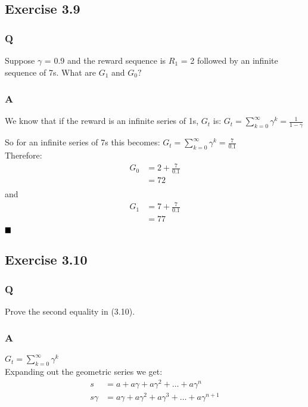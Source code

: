 \subsection{Exercise 3.9}
\subsubsection*{Q}
Suppose \(\gamma\)  = 0.9 and the reward sequence is $R_1$ = 2 followed by an infinite sequence of 7s. What are $G_1$ and $G_0?$

\subsubsection*{A}
We know that if the reward is an infinite series of 1s, $G_t$ is:
$
G_t = \sum_{k=0}^{\infty} \gamma^k = \frac{1}{1-\gamma}
$

So for an infinite series of 7s this becomes:
$
G_t = \sum_{k=0}^{\infty} \gamma^k = \frac{7}{0.1}
$
\\
Therefore:
\begin{align}
G_0 &= 2 + \frac{7}{0.1} \\
&= 72\\
\end{align}
and 
\begin{align}
G_1 &= 7 + \frac{7}{0.1} \\
&= 77\\
\end{align}
$
\hfill \blacksquare
$

\subsection{Exercise 3.10}
\subsubsection*{Q}
Prove the second equality in (3.10). 

\subsubsection*{A}
$
G_t = \sum_{k=0}^{\infty} \gamma^k
$
\\
Expanding out the geometric series we get:
\begin{align}
s &= a + a\gamma + a\gamma^2 + \ldots + a\gamma^n\\
s\gamma &= a\gamma + a\gamma^2 + a\gamma^3+ \ldots + a\gamma^{n+1}\\
\end{align}

